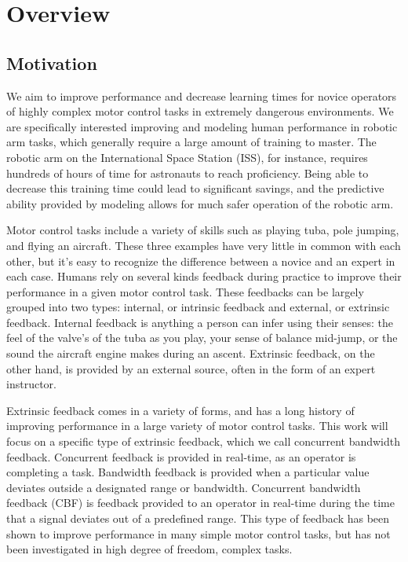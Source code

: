 \documentclass{paper}
\begin{document}
\clearpage
\tableofcontents

\clearpage
{}

\section{Overview}
\subsection{Motivation}
We aim to improve performance and decrease learning times for novice operators of highly complex motor control tasks in extremely dangerous environments.
We are specifically interested improving and modeling human performance in robotic arm tasks, which generally require a large amount of training to master.
The robotic arm on the International Space Station (ISS), for instance, requires hundreds of hours of time for astronauts to reach proficiency.
Being able to decrease this training time could lead to significant savings, and the predictive ability provided by modeling allows for much safer operation of the robotic arm.

Motor control tasks include a variety of skills such as playing tuba, pole jumping, and flying an aircraft.
These three examples have very little in common with each other, but it’s easy to recognize the difference between a novice and an expert in each case.
Humans rely on several kinds feedback during practice to improve their performance in a given motor control task.
These feedbacks can be largely grouped into two types: internal, or intrinsic feedback and external, or extrinsic feedback.
Internal feedback is anything a person can infer using their senses: the feel of the valve’s of the tuba as you play, your sense of balance mid-jump, or the sound the aircraft engine makes during an ascent.
Extrinsic feedback, on the other hand, is provided by an external source, often in the form of an expert instructor.

Extrinsic feedback comes in a variety of forms, and has a long history of improving performance in a large variety of motor control tasks.
This work will focus on a specific type of extrinsic feedback, which we call concurrent bandwidth feedback.
Concurrent feedback is provided in real-time, as an operator is completing a task.
Bandwidth feedback is provided when a particular value deviates outside a designated range or bandwidth.
Concurrent bandwidth feedback (CBF) is feedback provided to an operator in real-time during the time that a signal deviates out of a predefined range.
This type of feedback has been shown to improve performance in many simple motor control tasks, but has not been investigated in high degree of freedom, complex tasks.
\end{document}
